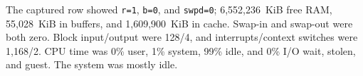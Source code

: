 The captured row showed \texttt{r=1}, \texttt{b=0}, and \texttt{swpd=0};
6,552,236~KiB free RAM, 55,028~KiB in buffers, and 1,609,900~KiB in cache.
Swap-in and swap-out were both zero. Block input/output were 128/4, and
interrupts/context switches were 1,168/2. CPU time was 0\% user, 1\% system,
99\% idle, and 0\% I/O wait, stolen, and guest. The system was mostly idle.
